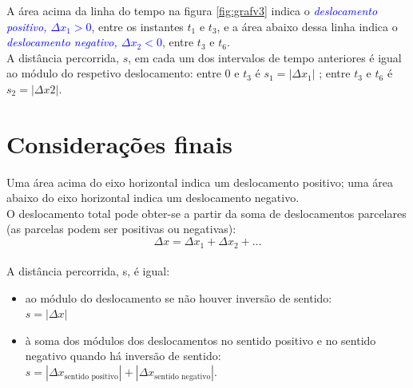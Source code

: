 \documentclass[a4paper,12pt]{article}
\begin{document}
	A área acima da linha do tempo na figura \ref{fig:grafv3} indica o \emph{\textcolor{blue}{deslocamento positivo, $\Delta x_1 > 0$}}, entre os instantes $t_1$ e $t_3$, e a área abaixo dessa linha indica o \emph{\textcolor{blue}{deslocamento negativo, $\Delta x_2 < 0$}}, entre $t_3$ e $t_6$.\\
	
	A distância percorrida, $s$, em cada um dos intervalos de tempo anteriores é igual ao módulo do respetivo deslocamento: entre 0 e $t_3$ é $s_1 = |\Delta x_1|$ ; entre $t_3$ e $t_6$ é $s_2 = |\Delta x2|$.\\
	
	\section{Considerações finais}
	Uma área acima do eixo horizontal indica um deslocamento positivo; uma área abaixo do eixo horizontal indica um deslocamento negativo.\\
	
	O deslocamento total pode obter-se a partir da soma de deslocamentos parcelares (as parcelas podem ser positivas ou negativas):\\
	
	\[\Delta x = \Delta x_1 + \Delta x_2 + …\]\\
	
	A distância percorrida, s, é igual:
	\begin{itemize}
		\item ao módulo do deslocamento se não houver inversão de sentido:\\
		$s = |\Delta x|$
		\item à soma dos módulos dos deslocamentos no sentido positivo e no sentido negativo quando há inversão de sentido: \\
		$s = |\Delta x_\text{sentido positivo}| + |\Delta x_\text{sentido negativo}|$.
	\end{itemize}
	

	
	
\end{document}
